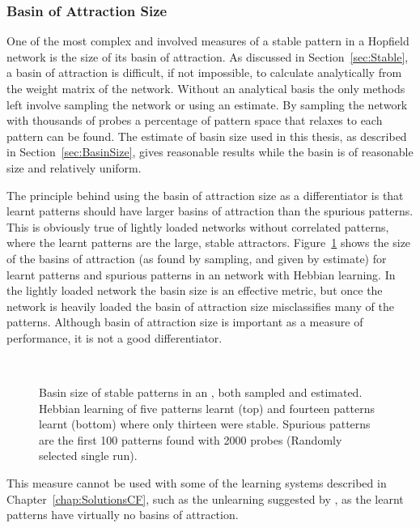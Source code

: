 \subsubsection{Basin of Attraction Size} %
\label{sec:BasinSizeTest}

One of the most complex and involved measures of a stable pattern in a Hopfield network is the size of its basin of attraction.  As discussed in Section~\ref{sec:Stable}, a basin of attraction is difficult, if not impossible, to calculate analytically from the weight matrix of the network.  Without an analytical basis the only methods left involve sampling the network or using an estimate.  By sampling the network with thousands of probes a percentage of pattern space that relaxes to each pattern can be found. The estimate of basin size used in this thesis, as described in Section~\ref{sec:BasinSize}, gives reasonable results while the basin is of reasonable size and relatively uniform.

The principle behind using the basin of attraction size as a differentiator is that learnt patterns should have larger basins of attraction than the spurious patterns.  This is obviously true of lightly loaded networks without correlated patterns, where the learnt patterns are the large, stable attractors.  Figure~\ref{fig:BasinSize} shows the size of the basins of attraction (as found by sampling, and given by estimate) for learnt patterns and spurious patterns in an  network with Hebbian learning.  In the lightly loaded network the basin size is an effective metric, but once the network is heavily loaded the basin of attraction size misclassifies many of the patterns. Although basin of attraction size is important as a measure of performance, it is not a good differentiator.  

\begin{figure}[p]
	\small
	\center
%	
	\vspace{1cm}
	\\
%	
	\caption{Basin size of stable patterns in an , both sampled and estimated. Hebbian learning of five patterns learnt (top) and fourteen patterns learnt (bottom) where only thirteen were stable. Spurious patterns are the first 100 patterns found with 2000 probes (Randomly selected single run). }
	\label{fig:BasinSize}
\end{figure}

This measure cannot be used with some of the learning systems described in Chapter~\ref{chap:SolutionsCF}, such as the unlearning suggested by \citet{vanHemmen1997}, as the learnt patterns have virtually no basins of attraction.  

